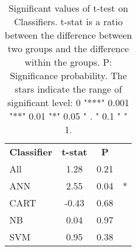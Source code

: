 

\begin{table}[htbp]
\begin{center}
\begin{tabular}{|l|c|c|c}
\cline{1-3}
\textbf{Classifier} & \textbf{t-stat} & \textbf{P}\\
\cline{1-3}
          All &   1.28 &   0.21 &    \\
          ANN &   2.55 &   0.04  &  * \\
          CART &   -0.43 &  0.68 &   \\
          NB &   0.04 &   0.97 &     \\
          SVM &   0.95 &   0.38 &   \\


\cline{1-3}
\end{tabular}
\caption[]
{\small
  Significant values of t-test on Classifiers.  t-stat is a ratio between the difference between two groups and the difference within the groups. P: Significance probability. The stars indicate the range of significant level: 0 "***" 0.001 "**" 0.01 "*" 0.05 " . " 0.1 " " 1.
}
\label{table:ttest_result}
\end{center}
\end{table}


%
